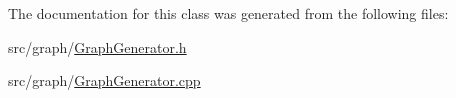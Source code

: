 The documentation for this class was generated from the following files\-:\begin{DoxyCompactItemize}
\item 
src/graph/\hyperlink{_graph_generator_8h}{Graph\-Generator.\-h}\item 
src/graph/\hyperlink{_graph_generator_8cpp}{Graph\-Generator.\-cpp}\end{DoxyCompactItemize}
